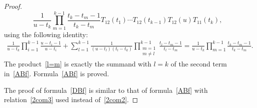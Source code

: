 \documentclass[10pt,a4paper]{amsart}
\numberwithin{equation}{section}
\begin{document}
\begin{proof}
\begin{equation}\label{l=m}
\frac{1}{u-t_k}\prod_{m=1}^{k-1} \frac{t_k-t_m-1}{t_k-t_m} T_{12} (t_1)\cdots T_{12} (t_{k-1}) T_{12} (u)T_{11} (t_k),
\end{equation}
using the following identity:
\begin{gather*}
\frac{1}{u-t_k} \prod_{i=1}^{k-1}\frac{u-t_i-1}{u-t_i} + \sum_{l=1}^{k-1} \frac{1}{(u-t_l)(t_l-t_k)}\prod_{\substack{m=1\\m\neq l}}^{k-1} \frac{t_l-t_m-1}{t_l-t_m}= \frac{1}{u-t_k}\prod_{m=1}^{k-1} \frac{t_k-t_m-1}{t_k-t_m}.
\end{gather*}
The product~\eqref{l=m} is exactly the summand with $l=k$ of the second term in~\eqref{ABf}. Formula~\eqref{ABf} is proved.

The proof of formula~\eqref{DBf} is similar to that of formula~\eqref{ABf} with relation~\eqref{2com3} used instead of~\eqref{2com2}.
\end{proof}
\end{document}
